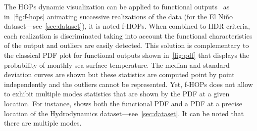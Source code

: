 The HOPs dynamic visualization can be applied to functional outputs~\citep{Kale2018} as in~\cref{fig:f-hops} animating successive realizations of the data (for the El Ni\~no dataset---see~\cref{sec:dataset}), it is noted f-HOPs. When combined to HDR criteria, each realization is discriminated taking into account the functional characteristics of the output and outliers are easily detected. This solution is complementary to the classical PDF plot for functional outputs shown in~\cref{fig:pdf} that displays the probability of monthly sea surface temperature. The median and standard deviation curves are shown but these statistics are computed point by point independently and the outliers cannot be represented. Yet, f-HOPs does not allow to exhibit multiple modes statistics that are shown by the PDF at a given location. For instance,  shows both the functional PDF and a PDF at a precise location of the Hydrodynamics dataset---see~\cref{sec:dataset}. It can be noted that there are multiple modes.


